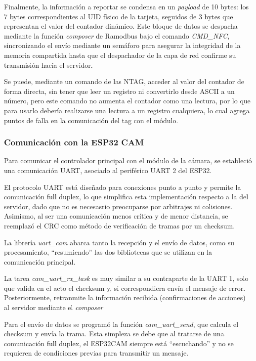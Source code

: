 Finalmente, la información a reportar se condensa en un \textit{payload} de 10 bytes: los 7 bytes correspondientes al UID físico de la tarjeta, seguidos de 3 bytes que representan el valor del contador dinámico. Este bloque de datos se despacha mediante la función \textit{composer} de Ramodbus bajo el comando \textit{CMD\_NFC}, sincronizando el envío mediante un semáforo para asegurar la integridad de la memoria compartida hasta que el despachador de la capa de red confirme su transmisión hacia el servidor.

Se puede, mediante un comando de las NTAG, acceder al valor del contador de forma directa, sin tener que leer un registro ni convertirlo desde ASCII a un número, pero este comando no aumenta el contador como una lectura, por lo que para usarlo debería realizarse una lectura a un registro cualquiera, lo cual agrega puntos de falla en la comunicación del tag con el módulo.

\subsubsection{Comunicación con la ESP32 CAM}
Para comunicar el controlador principal con el módulo de la cámara, se estableció una comunicación UART, asociado al periférico UART 2 del ESP32. 

El protocolo UART está diseñado para conexiones punto a punto y permite la comunicación full duplex, lo que simplifica esta implementación respecto a la del servidor, dado que no es necesasrio preocuparse por arbitrajes ni colisiones. Asimismo, al ser una comunicación menos crítica y de menor distancia, se reemplazó el CRC como método de verificación de tramas por un checksum.

La librería \textit{uart\_cam} abarca tanto la recepción y el envío de datos, como su procesamiento, \enquote{resumiendo} las dos bibliotecas que se utilizan en la comunicación principal.

La tarea \textit{cam\_uart\_rx\_task} es muy similar a su contraparte de la UART 1, solo que valida en el acto el checksum y, si correspondiera envía el mensaje de error. Posteriormente, retranmite la información recibida (confirmaciones de acciones) al servidor mediante el \textit{composer}

Para el envío de datos se programó la función \textit{cam\_uart\_send}, que calcula el checksum y envía la trama. Esta simpleza se debe que al tratarse de una comunicación full duplex, el ESP32CAM siempre está \enquote{escuchando} y no se requieren de condiciones previas para transmitir un mensaje.


